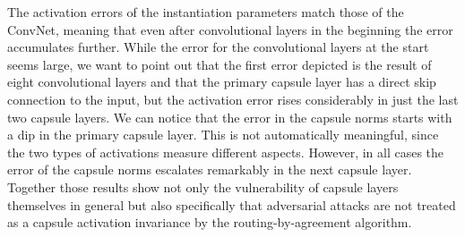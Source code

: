 The activation errors of the instantiation parameters match those of the ConvNet, meaning that even after convolutional layers in the beginning the error accumulates further.
While the error for the convolutional layers at the start seems large, we want to point out that the first error depicted is the result of eight convolutional layers and that the primary capsule layer has a direct skip connection to the input, but the activation error rises considerably in just the last two capsule layers.
We can notice that the error in the capsule norms starts with a dip in the primary capsule layer.
This is not automatically meaningful, since the two types of activations measure different aspects.
However, in all cases the error of the capsule norms escalates remarkably in the next capsule layer.
Together those results show not only the vulnerability of capsule layers themselves in general but also specifically that adversarial attacks are not treated as a capsule activation invariance by the routing-by-agreement algorithm.
